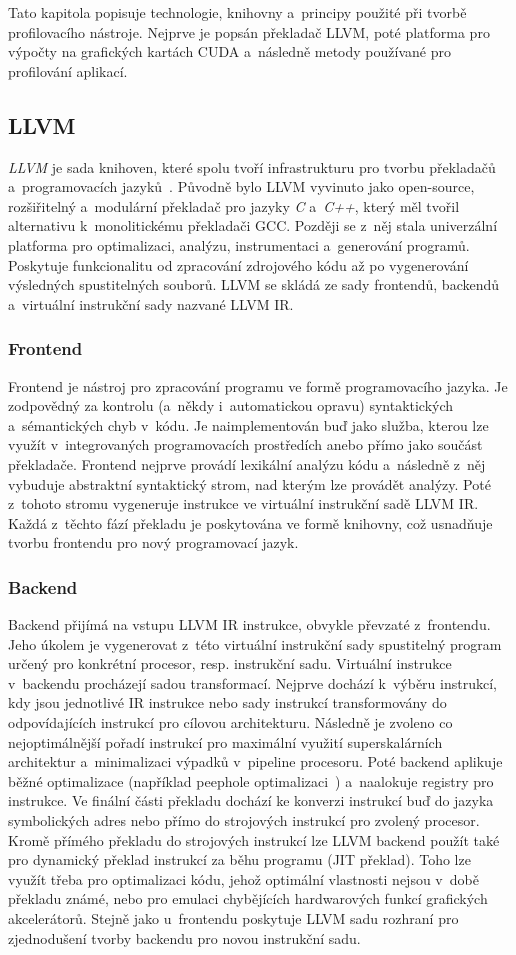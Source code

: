 Tato kapitola popisuje technologie, knihovny a~principy použité při tvorbě profilovacího nástroje. Nejprve je popsán překladač LLVM, poté platforma pro výpočty na grafických kartách CUDA a~následně metody používané pro profilování aplikací.

\subsection{LLVM}
\emph{LLVM} je sada knihoven, které spolu tvoří infrastrukturu pro tvorbu překladačů a~programovacích jazyků~\cite{llvm}. Původně bylo LLVM vyvinuto jako open-source, rozšiřitelný a~modulární překladač pro jazyky \emph{C} a~\emph{C++}, který měl tvořil alternativu k~monolitickému překladači GCC. Později se z~něj stala univerzální platforma pro optimalizaci, analýzu, instrumentaci a~generování programů. Poskytuje funkcionalitu od zpracování zdrojového kódu až po vygenerování výsledných spustitelných souborů. LLVM se skládá ze sady frontendů, backendů a~virtuální instrukční sady nazvané LLVM IR.
\subsubsection*{Frontend}
Frontend je nástroj pro zpracování programu ve formě programovacího jazyka. Je zodpovědný za kontrolu (a~někdy i~automatickou opravu) syntaktických a~sémantických chyb v~kódu. Je naimplementován buď jako služba, kterou lze využít v~integrovaných programovacích prostředích anebo přímo jako součást překladače. Frontend nejprve provádí lexikální analýzu kódu a~následně z~něj vybuduje abstraktní syntaktický strom, nad kterým lze provádět analýzy. Poté z~tohoto stromu vygeneruje instrukce ve virtuální instrukční sadě LLVM IR. Každá z~těchto fází překladu je poskytována ve formě knihovny, což usnadňuje tvorbu frontendu pro nový programovací jazyk.
\subsubsection*{Backend}
Backend přijímá na vstupu LLVM IR instrukce, obvykle převzaté z~frontendu. Jeho úkolem je vygenerovat z~této virtuální instrukční sady spustitelný program určený pro konkrétní procesor, resp. instrukční sadu. Virtuální instrukce v~backendu procházejí sadou transformací. Nejprve dochází k~výběru instrukcí, kdy jsou jednotlivé IR instrukce nebo sady instrukcí transformovány do odpovídajících instrukcí pro cílovou architekturu. Následně je zvoleno co nejoptimálnější pořadí instrukcí pro maximální využití superskalárních architektur a~minimalizaci výpadků v~pipeline procesoru. Poté backend aplikuje běžné optimalizace (například peephole optimalizaci~\cite{peephole}) a~naalokuje registry pro instrukce. Ve finální části překladu dochází ke konverzi instrukcí buď do jazyka symbolických adres nebo přímo do strojových instrukcí pro zvolený procesor. Kromě přímého překladu do strojových instrukcí lze LLVM backend použít také pro dynamický překlad instrukcí za běhu programu (JIT překlad). Toho lze využít třeba pro optimalizaci kódu, jehož optimální vlastnosti nejsou v~době překladu známé, nebo pro emulaci chybějících hardwarových funkcí grafických akcelerátorů. Stejně jako u~frontendu poskytuje LLVM sadu rozhraní pro zjednodušení tvorby backendu pro novou instrukční sadu.
